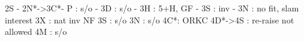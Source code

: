 2S - 
2N*->3C*- P  : s/o
        - 3D : s/o
        - 3H : 5+H, GF
        - 3S : inv
        - 3N : no fit, slam interest
3X : nat inv NF
3S : s/o
3N : s/o
4C*: ORKC
4D*->4S : re-raise not allowed
4M : s/o
